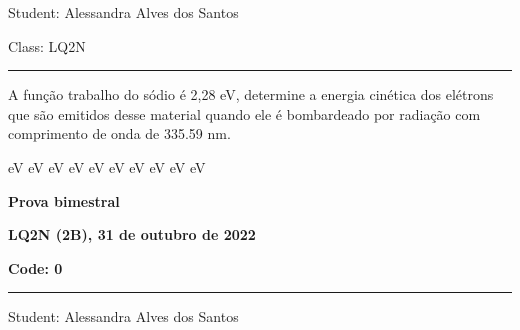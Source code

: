 \documentclass[12pt, addpoints]{exam}
\begin{document}
        \begin{minipage}{0.75\linewidth}
            \begin{flushleft}
                Student: Alessandra Alves dos Santos
            \end{flushleft}
        \end{minipage}
        \begin{minipage}{0.20\linewidth}
            \begin{flushright}
                Class: LQ2N
            \end{flushright}
        \end{minipage}
        \vspace{0.5cm} \hrule \vspace{0.5cm}
        \begin{questions}
\begin{multicols*}{2}
\question A função trabalho do sódio é 2,28 eV, determine a energia cinética dos elétrons que são emitidos desse material quando ele é bombardeado por radiação com comprimento de onda de  335.59 nm.

\begin{oneparchoices}
 eV eV eV eV eV eV eV eV eV eV
\end{oneparchoices}\end{multicols*}
\end{questions}
\newpage
        \begin{minipage}[b]{0.75\linewidth}
            \begin{flushleft}
                {\bf \large Prova bimestral}
            \end{flushleft}
            \begin{flushleft}
                {\bf \large LQ2N (2B), 31 de outubro de 2022}
            \end{flushleft}
        \end{minipage}
        \begin{minipage}[b]{0.20\linewidth}
            \begin{flushright}
                {\bf \large Code: 0}
            \end{flushright}
        \end{minipage}
        \vspace{0.5cm} \hrule \vspace{0.5cm}
        \begin{minipage}{0.75\linewidth}
            \begin{flushleft}
                Student: Alessandra Alves dos Santos
            \end{flushleft}
        \end{minipage}
\end{document}
